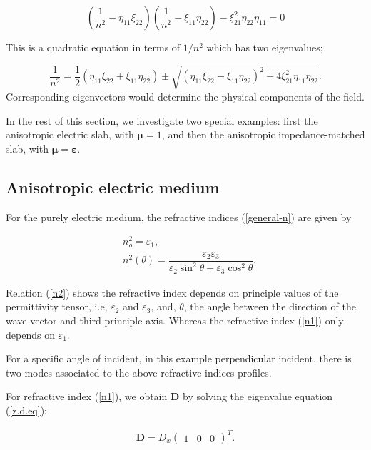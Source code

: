 \documentclass[9pt,twocolumn,twoside]{osajnl}
\begin{document}
\begin{equation}\label{gn}
 \left( \dfrac{1}{n^2}- \eta_{11} \xi_{22}\right)\left(\dfrac{1}{n^2}-\xi_{11}\eta_{22}\right)-\xi_{21}^{2}\eta_{22}\eta_{11}=0
\end{equation}

This is a quadratic equation in terms of $1/n^2$ which has two eigenvalues;

\begin{equation}\label{general-n}
\dfrac{1}{n^2}=\dfrac{1}{2} \left( \eta_{11} \xi_{22}+\xi_{11}\eta_{22}\right)\pm \sqrt{\left(\eta_{11} \xi_{22}-\xi_{11}\eta_{22}\right)^{2}+4\xi_{21}^{2}\eta_{11}\eta_{22}}.
\end{equation}
Corresponding eigenvectors would determine the physical components of the field. 

In the rest of this section, we investigate two special examples: first the anisotropic electric slab, with $\boldsymbol \mu=1$, and then the anisotropic impedance-matched slab, with $\boldsymbol \mu = \boldsymbol \varepsilon $. 

\subsection{Anisotropic electric medium}\label{electric anisotropic}

For the purely electric medium, the refractive indices (\ref{general-n}) are given by

\begin{eqnarray}
        &n_{o}^2=\varepsilon_{1} \label{n1},\\
        &n^{2}(\theta)=\dfrac{\varepsilon_{2}\varepsilon_{3}}{\varepsilon_{2}\sin^{2}{\theta}+\varepsilon_{3}\cos^{2}{\theta}} \label{n2}.
\end{eqnarray}    

Relation (\ref{n2}) shows the refractive index depends on principle values of the permittivity tensor, i.e, $\varepsilon_{2}$ and $\varepsilon_{3}$, and, $\theta$, the angle between  the direction of the wave vector and third principle axis. Whereas the refractive index (\ref{n1}) only depends on $\varepsilon_{1}$.

For a specific angle of incident, in this example perpendicular incident, there is two modes associated to the above refractive indices profiles. 

For refractive index (\ref{n1}), we obtain $\mathbf{D}$ by solving the eigenvalue equation (\ref{z.d.eq}):

\begin{align} \label{mod-n1}
        \mathbf{D}=D_{x}
         \begin{pmatrix}
            1 &0&0
         \end{pmatrix}^{T}.    
\end{align}
\end{document}
